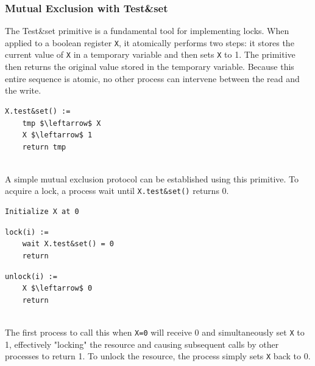 \subsubsection{Mutual Exclusion with Test\&set}
The Test\&set primitive is a fundamental tool for implementing locks. When applied to a boolean register \texttt{X}, it atomically performs two steps: it stores the current value of \texttt{X} in a temporary variable and then sets \texttt{X} to 1. The primitive then returns the original value stored in the temporary variable. Because this entire sequence is atomic, no other process can intervene between the read and the write.

\begin{minipage}{\textwidth}
\begin{lstlisting}[mathescape]
X.test&set() :=
    tmp $\leftarrow$ X
    X $\leftarrow$ 1
    return tmp
\end{lstlisting}
\end{minipage}\\

A simple mutual exclusion protocol can be established using this primitive. To acquire a lock, a process wait until \texttt{X.test\&set()} returns 0. 

\begin{minipage}{\textwidth}
\begin{lstlisting}[mathescape]
Initialize X at 0
\end{lstlisting}
\begin{minipage}{0.45\textwidth}
\begin{lstlisting}[mathescape]
lock(i) :=
    wait X.test&set() = 0
    return
\end{lstlisting}
\end{minipage}
\hfill
\begin{minipage}{0.45\textwidth}
\begin{lstlisting}[mathescape]
unlock(i) :=
    X $\leftarrow$ 0
    return
\end{lstlisting}
\end{minipage}
\end{minipage}\\

The first process to call this when \texttt{X=0} will receive 0 and simultaneously set \texttt{X} to 1, effectively "locking" the resource and causing subsequent calls by other processes to return 1. To unlock the resource, the process simply sets \texttt{X} back to 0.

